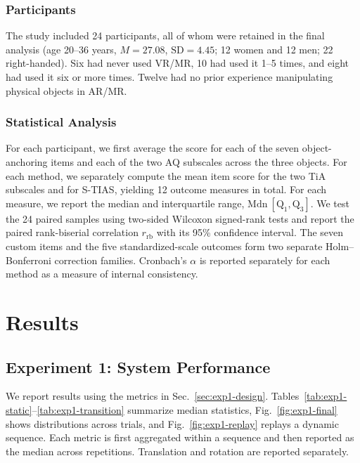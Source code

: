 \documentclass[review]{vgtc}
\begin{document}
\subsubsection{Participants}

The study included 24 participants, all of whom were retained in the final analysis (age 20--36 years, $M=27.08$, $\mathrm{SD}=4.45$; 12 women and 12 men; 22 right-handed). Six had never used VR/MR, 10 had used it 1--5 times, and eight had used it six or more times. Twelve had no prior experience manipulating physical objects in AR/MR.

\subsubsection{Statistical Analysis}

For each participant, we first average the score for each of the seven object-anchoring items and each of the two AQ subscales across the three objects. For each method, we separately compute the mean item score for the two TiA subscales and for S-TIAS, yielding 12 outcome measures in total. For each measure, we report the median and interquartile range, $\mathrm{Mdn}\ [\mathrm{Q}_1, \mathrm{Q}_3]$. We test the 24 paired samples using two-sided Wilcoxon signed-rank tests and report the paired rank-biserial correlation $r_{\mathrm{rb}}$ with its 95\% confidence interval. The seven custom items and the five standardized-scale outcomes form two separate Holm--Bonferroni correction families. Cronbach's $\alpha$ is reported separately for each method as a measure of internal consistency.

\section{Results}\label{sec:results}

\subsection{Experiment 1: System Performance}

We report results using the metrics in Sec.~\ref{sec:exp1-design}. Tables~\ref{tab:exp1-static}--\ref{tab:exp1-transition} summarize median statistics, Fig.~\ref{fig:exp1-final} shows distributions across trials, and Fig.~\ref{fig:exp1-replay} replays a dynamic sequence. Each metric is first aggregated within a sequence and then reported as the median across repetitions. Translation and rotation are reported separately.
\end{document}
